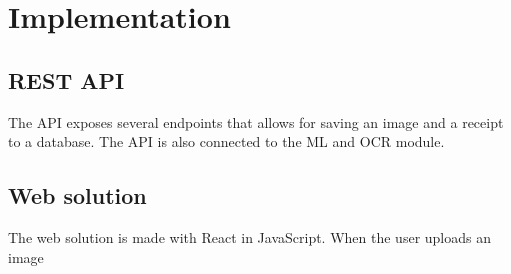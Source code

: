 \cleardoublepage
\chapter{Implementation }
\label{chap:implementation}

\section{REST API}

The API exposes several endpoints that allows for saving an image and a receipt to a database.
The API is also connected to the ML and OCR module.


\section{Web solution}

The web solution is made with React in JavaScript.
When the user uploads an image
